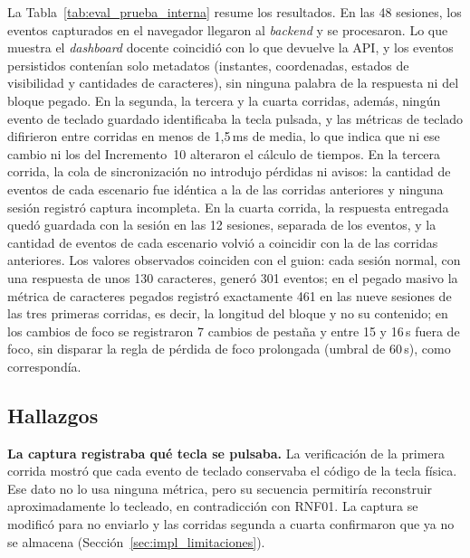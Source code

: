 La Tabla~\ref{tab:eval_prueba_interna} resume los resultados. En las 48 sesiones, los eventos capturados en el navegador llegaron al \textit{backend} y se procesaron. Lo que muestra el \textit{dashboard} docente coincidió con lo que devuelve la API, y los eventos persistidos contenían solo metadatos (instantes, coordenadas, estados de visibilidad y cantidades de caracteres), sin ninguna palabra de la respuesta ni del bloque pegado. En la segunda, la tercera y la cuarta corridas, además, ningún evento de teclado guardado identificaba la tecla pulsada, y las métricas de teclado difirieron entre corridas en menos de 1,5\,ms de media, lo que indica que ni ese cambio ni los del Incremento~10 alteraron el cálculo de tiempos. En la tercera corrida, la cola de sincronización no introdujo pérdidas ni avisos: la cantidad de eventos de cada escenario fue idéntica a la de las corridas anteriores y ninguna sesión registró captura incompleta. En la cuarta corrida, la respuesta entregada quedó guardada con la sesión en las 12 sesiones, separada de los eventos, y la cantidad de eventos de cada escenario volvió a coincidir con la de las corridas anteriores. Los valores observados coinciden con el guion: cada sesión normal, con una respuesta de unos 130 caracteres, generó 301 eventos; en el pegado masivo la métrica de caracteres pegados registró exactamente 461 en las nueve sesiones de las tres primeras corridas, es decir, la longitud del bloque y no su contenido; en los cambios de foco se registraron 7 cambios de pestaña y entre 15 y 16\,s fuera de foco, sin disparar la regla de pérdida de foco prolongada (umbral de 60\,s), como correspondía.

\subsection{Hallazgos}

\textbf{La captura registraba qué tecla se pulsaba.} La verificación de la primera corrida mostró que cada evento de teclado conservaba el código de la tecla física. Ese dato no lo usa ninguna métrica, pero su secuencia permitiría reconstruir aproximadamente lo tecleado, en contradicción con RNF01. La captura se modificó para no enviarlo y las corridas segunda a cuarta confirmaron que ya no se almacena (Sección~\ref{sec:impl_limitaciones}).

